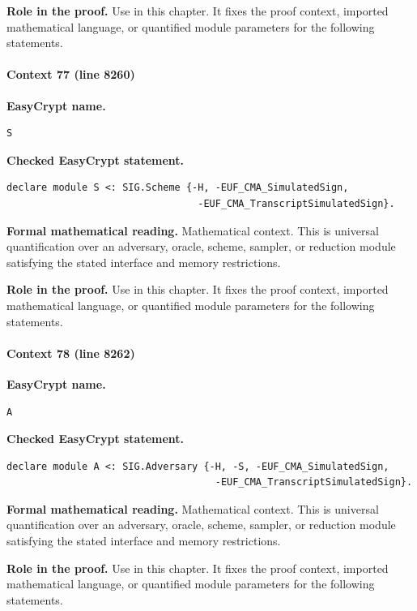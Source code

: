 \noindent\textbf{Role in the proof.}
Use in this chapter. It fixes the proof context, imported mathematical language, or quantified module parameters for the following statements.

\paragraph{Context 77 (line 8260)}
\noindent\textbf{EasyCrypt name.}
\begin{lstlisting}[language=EasyCrypt,basicstyle=\ttfamily\scriptsize]
S
\end{lstlisting}
\noindent\textbf{Checked EasyCrypt statement.}
\begin{lstlisting}[language=EasyCrypt,basicstyle=\ttfamily\scriptsize]
declare module S <: SIG.Scheme {-H, -EUF_CMA_SimulatedSign,
                                 -EUF_CMA_TranscriptSimulatedSign}.
\end{lstlisting}
\noindent\textbf{Formal mathematical reading.}
Mathematical context. This is universal quantification over an adversary, oracle, scheme, sampler, or reduction module satisfying the stated interface and memory restrictions.

\noindent\textbf{Role in the proof.}
Use in this chapter. It fixes the proof context, imported mathematical language, or quantified module parameters for the following statements.

\paragraph{Context 78 (line 8262)}
\noindent\textbf{EasyCrypt name.}
\begin{lstlisting}[language=EasyCrypt,basicstyle=\ttfamily\scriptsize]
A
\end{lstlisting}
\noindent\textbf{Checked EasyCrypt statement.}
\begin{lstlisting}[language=EasyCrypt,basicstyle=\ttfamily\scriptsize]
declare module A <: SIG.Adversary {-H, -S, -EUF_CMA_SimulatedSign,
                                    -EUF_CMA_TranscriptSimulatedSign}.
\end{lstlisting}
\noindent\textbf{Formal mathematical reading.}
Mathematical context. This is universal quantification over an adversary, oracle, scheme, sampler, or reduction module satisfying the stated interface and memory restrictions.

\noindent\textbf{Role in the proof.}
Use in this chapter. It fixes the proof context, imported mathematical language, or quantified module parameters for the following statements.

